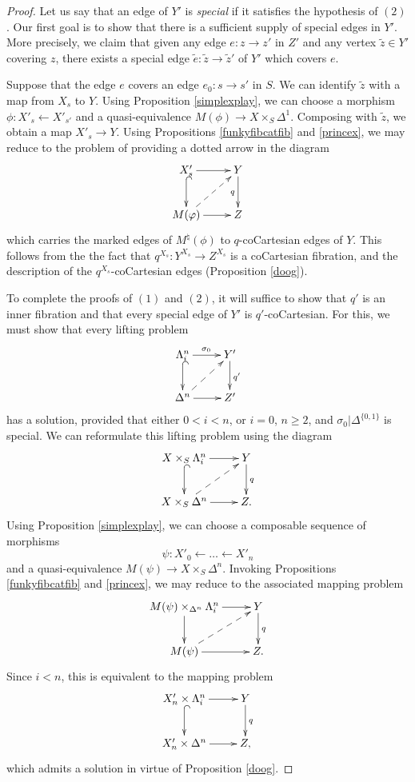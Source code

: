 \begin{proof}
Let us say that an edge of $Y'$ is {\it special} if it satisfies the hypothesis of $(2)$. Our first goal is to show that there is a sufficient supply of special edges in $Y'$. More precisely, we claim that given any edge $e: z \rightarrow z'$ in $Z'$ and any vertex $\widetilde{z} \in Y'$ covering $z$, there exists a special edge $\widetilde{e}: \widetilde{z} \rightarrow \widetilde{z}'$ of $Y'$ which covers $e$. 

Suppose that the edge $e$ covers an edge $e_0: s \rightarrow s'$ in $S$. We can identify
$\widetilde{z}$ with a map from $X_{s}$ to $Y$.
Using Proposition \ref{simplexplay}, we can choose a morphism $\phi: X'_{s} \leftarrow X'_{s'}$ and a quasi-equivalence $M(\phi) \rightarrow X \times_{S} \Delta^1$. Composing with $\widetilde{z}$, we obtain a map $X'_{s} \rightarrow Y$. Using Propositions \ref{funkyfibcatfib} and \ref{princex}, we may reduce to the problem of providing a dotted arrow in the diagram
$$ \xymatrix{ X'_{s} \ar@{^{(}->}[d] \ar[r] & Y \ar[d]_{q} \\
M(\phi) \ar@{-->}[ur] \ar[r] & Z }$$
which carries the marked edges of $M^{\natural}(\phi)$ to $q$-coCartesian edges of $Y$.
This follows from the the fact that $q^{X_{s}}: Y^{X_{s}} \rightarrow Z^{X_{s}}$ is a coCartesian fibration, and the description of the $q^{X_{s}}$-coCartesian edges (Proposition \ref{doog}).

To complete the proofs of $(1)$ and $(2)$, it will suffice to show that $q'$ is an inner fibration and that every special edge of $Y'$ is $q'$-coCartesian. For this, we must show that every lifting problem
$$ \xymatrix{ \Lambda^n_i \ar[r]^{\sigma_0} \ar@{^{(}->}[d] & Y' \ar[d]^{q'} \\
\Delta^n \ar[r] \ar@{-->}[ur] & Z' }$$
has a solution, provided that either $0 < i < n$, or $i =0$, $n \geq 2$, and
$\sigma_0 | \Delta^{ \{0,1\} }$ is special. We can reformulate this lifting problem
using the diagram
$$ \xymatrix{ X \times_{S} \Lambda^n_i \ar[r] \ar@{^{(}->}[d] & Y \ar[d]^{q} \\
X \times_{S} \Delta^n \ar[r] \ar@{-->}[ur] & Z. }$$
Using Proposition \ref{simplexplay}, we can choose a composable sequence of morphisms
$$ \psi: X'_0 \leftarrow \ldots \leftarrow X'_{n} $$
and a quasi-equivalence $M(\psi) \rightarrow X \times_{S} \Delta^n$. Invoking
Propositions \ref{funkyfibcatfib} and \ref{princex}, we may reduce to the associated mapping problem
$$ \xymatrix{ M(\psi) \times_{ \Delta^n} \Lambda^n_i \ar[r] \ar[d] & Y \ar[d]^{q} \\
M(\psi) \ar[r] \ar@{-->}[ur] & Z.}$$
Since $i < n$, this is equivalent to the mapping problem
$$ \xymatrix{ X'_{n} \times \Lambda^n_i \ar[r] \ar@{^{(}->}[d] & Y \ar[d]^{q} \\
X'_{n} \times \Delta^n \ar[r] & Z, }$$
which admits a solution in virtue of Proposition \ref{doog}.
\end{proof}

